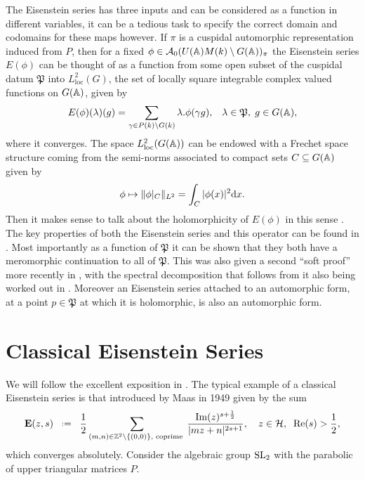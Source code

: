 The Eisenstein series has three inputs and can be considered as a function in different variables, it can be a tedious task to specify the correct domain and codomains for these maps however. If \(\pi\) is a cuspidal automorphic representation induced from \(P\), then for a fixed \(\phi \in\mathcal{A}_0(U(\A)M(k)\setminus G(\A))_\pi \) the Eisenstein series \(E(\phi)\) can be thought of as a function from some open subset of the cuspidal datum \(\mathfrak{P}\) into \(L^2_{\mathrm{loc}}(G)\), the set of locally square integrable complex valued functions on \(G(\A)\), given by 
\[E(\phi)(\lambda)(g) = \sum_{\gamma \in P(k)\backslash G(k)} \lambda.\phi(\gamma g), \;\;\; \lambda\in \mathfrak{P},\; g\in G(\A),\]
where it converges. The space \(L^2_{\mathrm{loc}}(G(\A))\) can be endowed with a Frechet space structure coming from the semi-norms associated to compact sets \(C\subseteq G(\A)\) given by 
\[\phi \mapsto \norm{\phi|_C}_{L^2} = \int_C |\phi(x)|^2 \mathrm{d}x.\] 
Then it makes sense to talk about the holomorphicity of \(E(\phi)\) in this sense \cite[I.4.9]{moeglinSpectralDecompositionEisenstein1995}. The key properties of both the Eisenstein series and this operator can be found in \cite[IV.1.8, IV.1.9, IV.1.10, IV.1.11]{moeglinSpectralDecompositionEisenstein1995}. Most importantly as a function of \(\mathfrak{P}\) it can be shown that they both have a meromorphic continuation to all of \(\mathfrak{P}\). This was also given a second ``soft proof'' more recently in \cite{bernsteinMeromorphicContinuationEisenstein2022}, with the spectral decomposition that follows from it also being worked out in \cite{delormeSpectralTheoremLanglands2021}. Moreover an Eisenstein series attached to an automorphic form, at a point \(p\in \mathfrak{P}\) at which it is holomorphic, is also an automorphic form. 

\section{Classical Eisenstein Series}\label{sec:classic-eisenstein}
We will follow the excellent exposition in \cite{garrettTransitionEisensteinSeries2016}. The typical example of a classical Eisenstein series is that introduced by Maas in 1949 \cite{lapidPerspectivesEisensteinSeries2022}  given by the sum 
\[\mathbf{E}(z, s) \defeq \frac{1}{2} \sum_{(m,n)\in \Z^2\setminus \{(0,0)\}, \text{ coprime }} \frac{\mathrm{Im}(z)^{s+\frac{1}{2}}}{|mz+n|^{2s+1}}, \quad z\in \mathcal{H},\;\; \mathrm{Re}(s)>\frac{1}{2},\]
which converges absolutely. Consider the algebraic group \(\operatorname{SL}_2\) with the parabolic of upper triangular matrices \(P\).


